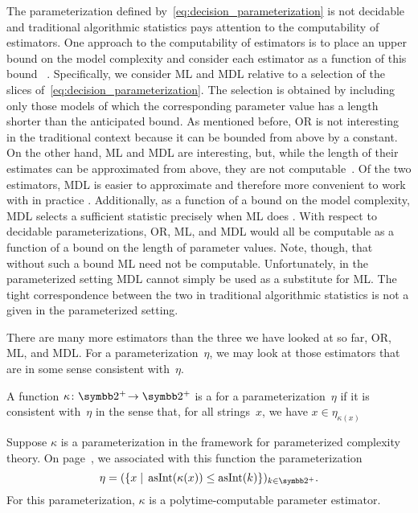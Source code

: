 The parameterization defined by~\eqref{eq:decision_parameterization} is not decidable and traditional algorithmic statistics pays attention to the computability of estimators.
One approach to the computability of estimators is to place an upper bound on the model complexity and consider each estimator as a function of this bound~\parencite{gacs2001algorithmic,vereshchagin2004kolmogorov} \parencite[in the presence of resource bounds,][]{milovanov2017algorithmic}.
Specifically, we consider ML and MDL relative to a selection of the slices of~\eqref{eq:decision_parameterization}.
The selection is obtained by including only those models of which the corresponding parameter value has a length shorter than the anticipated bound.
As mentioned before, OR is not interesting in the traditional context because it can be bounded from above by a constant.
On the other hand, ML and MDL are interesting, but, while the length of their estimates can be approximated from above, they are not computable~\parencite{vereshchagin2004kolmogorov}.
Of the two estimators, MDL is easier to approximate and therefore more convenient to work with in practice \parencite[Section~V.B]{vereshchagin2004kolmogorov}.
Additionally, as a function of a bound on the model complexity, MDL selects a sufficient statistic precisely when ML does \parencite[Lemma~IV.2]{vereshchagin2004kolmogorov}.
With respect to decidable parameterizations, OR, ML, and MDL would all be computable as a function of a bound on the length of parameter values.
Note, though, that without such a bound ML need not be computable.
Unfortunately, in the parameterized setting MDL cannot simply be used as a substitute for ML.
The tight correspondence between the two in traditional algorithmic statistics is not a given in the parameterized setting.

There are many more estimators than the three we have looked at so far, OR, ML, and MDL.
For a parameterization~$\eta$, we may look at those estimators that are in some sense consistent with~$\eta$.
\begin{definition}
  A function $\kappa\colon \binary^+\! \to \binary^+$ is a  for a parameterization~$\eta$ if it is consistent with~$\eta$ in the sense that, for all strings~$x$, we have $x \in \eta_{\kappa(x)}$
\end{definition}
\begin{example}
  Suppose $\kappa$ is a parameterization in the \citeauthor{flum2006parameterized} framework for parameterized complexity theory.
  On page~\pageref{eq:flum_parameterization}, we associated with this function the parameterization
  \begin{equation*}
    \eta \deq (\{x \st \asNat(\kappa(x)) \le \asNat(k)\})_{k \in \binary^+}.
  \end{equation*}
  For this parameterization, $\kappa$ is a polytime-computable parameter estimator.
\end{example}

